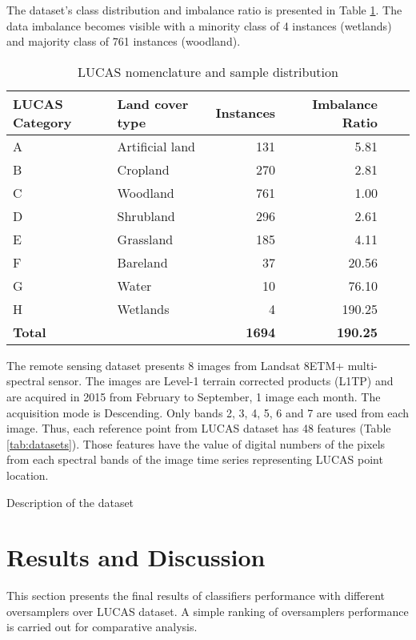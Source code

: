 \documentclass[parskip=full]{scrartcl}
\begin{document}
The dataset's class distribution and imbalance ratio is presented in Table 
\ref{tab:dataset_classes}. The data imbalance becomes visible with a minority 
class of 4 instances (wetlands) and majority class of 761 instances (woodland).

\begin{table}[H]
	\centering
	\begin{tabular}{llrrrr}
		\toprule
		\textbf{LUCAS Category} & \textbf{Land cover type} & \textbf{Instances}
		& \textbf{Imbalance Ratio} \\
		\hline
		A & Artificial land & 131 & 5.81 \\
		B & Cropland        & 270 & 2.81 \\
		C & Woodland        & 761 & 1.00 \\
		D & Shrubland       & 296 & 2.61 \\
		E & Grassland       & 185 & 4.11 \\
		F & Bareland        & 37  & 20.56 \\
		G & Water           & 10  & 76.10 \\
		H & Wetlands        & 4   & 190.25\\
		\hline
		\textbf{Total} & & \textbf{1694} &  \textbf{190.25} \\
		\bottomrule
	\end{tabular}
	\caption{\label{tab:dataset_classes}LUCAS nomenclature and sample distribution}
\end{table}

The remote sensing dataset presents 8 images from Landsat 8ETM+ multi-spectral
sensor. The images are Level-1 terrain corrected products (L1TP) and are
acquired in 2015 from February to September, 1 image each month. The 
acquisition mode is Descending. Only bands 2, 3, 4, 5, 6 and 7 are used from 
each image. Thus, each reference point from LUCAS dataset has 48 features 
(Table \ref{tab:datasets}). Those features have the value of digital numbers of 
the pixels from each spectral bands of the image time series representing LUCAS 
point location.

\begin{table}[H]
	\centering
	\caption{\label{tab:datasets}Description of the dataset}
\end{table}

\section{Results and Discussion}
This section presents the final results of classifiers performance with 
different oversamplers over LUCAS dataset. A simple ranking of oversamplers 
performance is carried out for comparative analysis.  
\end{document}
